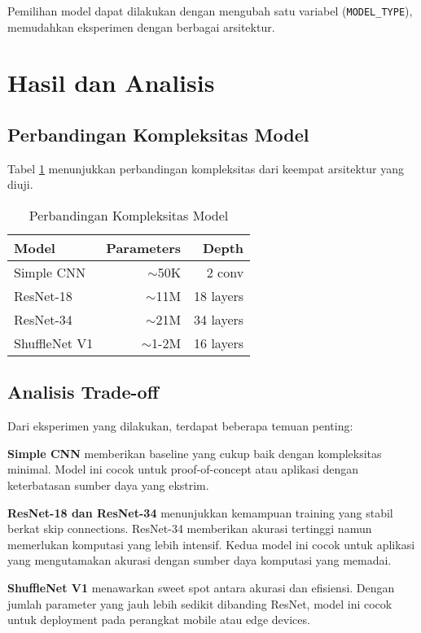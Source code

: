 \documentclass[conference]{IEEEtran}
\begin{document}
Pemilihan model dapat dilakukan dengan mengubah satu variabel (\texttt{MODEL\_TYPE}), memudahkan eksperimen dengan berbagai arsitektur.

\section{Hasil dan Analisis}

\subsection{Perbandingan Kompleksitas Model}
Tabel \ref{tab:model_comparison} menunjukkan perbandingan kompleksitas dari keempat arsitektur yang diuji.

\begin{table}[h]
\centering
\caption{Perbandingan Kompleksitas Model}
\label{tab:model_comparison}
\begin{tabular}{lrr}
\toprule
\textbf{Model} & \textbf{Parameters} & \textbf{Depth} \\
\midrule
Simple CNN & $\sim$50K & 2 conv \\
ResNet-18 & $\sim$11M & 18 layers \\
ResNet-34 & $\sim$21M & 34 layers \\
ShuffleNet V1 & $\sim$1-2M & 16 layers \\
\bottomrule
\end{tabular}
\end{table}

\subsection{Analisis Trade-off}
Dari eksperimen yang dilakukan, terdapat beberapa temuan penting:

\textbf{Simple CNN} memberikan baseline yang cukup baik dengan kompleksitas minimal. Model ini cocok untuk proof-of-concept atau aplikasi dengan keterbatasan sumber daya yang ekstrim.

\textbf{ResNet-18 dan ResNet-34} menunjukkan kemampuan training yang stabil berkat skip connections. ResNet-34 memberikan akurasi tertinggi namun memerlukan komputasi yang lebih intensif. Kedua model ini cocok untuk aplikasi yang mengutamakan akurasi dengan sumber daya komputasi yang memadai.

\textbf{ShuffleNet V1} menawarkan sweet spot antara akurasi dan efisiensi. Dengan jumlah parameter yang jauh lebih sedikit dibanding ResNet, model ini cocok untuk deployment pada perangkat mobile atau edge devices.
\end{document}
